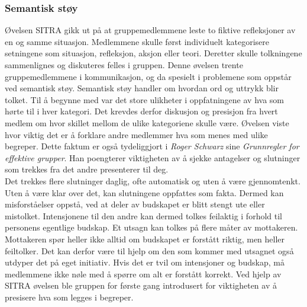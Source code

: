 \subsubsection{Semantisk støy}

Øvelsen SITRA gikk ut på at gruppemedlemmene leste to fiktive refleksjoner av en og samme situasjon.
Medlemmene skulle først individuelt kategorisere setningene som situasjon, refleksjon, aksjon eller teori.
Deretter skulle tolkningene sammenlignes og diskuteres felles i gruppen.
Denne øvelsen trente gruppemedlemmene i kommunikasjon, og da spesielt i problemene som oppstår ved semantisk støy.
Semantisk støy handler om hvordan ord og uttrykk blir tolket.
Til å begynne med var det store ulikheter i oppfatningene av hva som hørte til i hver kategori.
Det krevdes derfor diskusjon og presisjon fra hvert medlem om hvor skillet mellom de ulike kategoriene skulle være.
Øvelsen viste hvor viktig det er å forklare andre medlemmer hva som menes med ulike begreper. 
Dette faktum er også tydeliggjort i \textit{Roger Schwarz} sine \textit{Grunnregler for effektive grupper}\cite{schwarz}. 
Han poengterer viktigheten av å sjekke antagelser og slutninger som trekkes fra det andre presenterer til deg. \\

Det trekkes flere slutninger daglig, ofte automatisk og uten å være gjennomtenkt. 
Uten å være klar over det, kan slutningene oppfattes som fakta.
Dermed kan misforståelser oppstå, ved at deler av budskapet er blitt stengt ute eller mistolket. Intensjonene til den andre kan dermed tolkes feilaktig i forhold til personens egentlige budskap.
Et utsagn kan tolkes på flere måter av mottakeren.
Mottakeren spør heller ikke alltid om budskapet er forstått riktig, men heller feiltolker.
Det kan derfor være til hjelp om den som kommer med utsagnet også utdyper det på eget initiativ.
Hvis det er tvil om intensjoner og budskap, må medlemmene ikke nøle med å spørre om alt er forstått korrekt. Ved hjelp av SITRA øvelsen ble gruppen for første gang introdusert for viktigheten av å presisere hva som legges i begreper. \\

